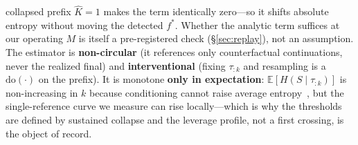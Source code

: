 \documentclass[11pt]{article}
\newcommand{\strat}{S}
\newcommand{\prefix}{\tau_{:k}}
\begin{document}
collapsed prefix $\hat K=1$ makes the term identically zero---so it shifts absolute
entropy without moving the detected $f^\ast$. Whether the analytic term suffices at
our operating $M$ is itself a pre-registered check (\S\ref{sec:replay}), not an
assumption. The estimator is
\textbf{non-circular} (it references only counterfactual continuations, never the
realized final) and \textbf{interventional} (fixing $\prefix$ and resampling is a
$\mathrm{do}(\cdot)$ on the prefix). It is monotone \textbf{only in expectation}:
$\mathbb{E}[H(\strat\mid\tau_{:k})]$ is non-increasing in $k$ because conditioning
cannot raise average entropy~\citep{cover2006elements}, but the single-reference
curve we measure can rise locally---which is why the thresholds are defined by
sustained collapse and the leverage profile, not a first crossing, is the object of
record.
\end{document}
